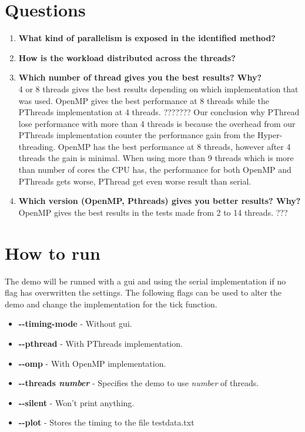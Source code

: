 \documentclass[a4paper,11pt]{article}
\begin{document}
\section{Questions}
\begin{enumerate}[label=\Alph*.]
\item \textbf{What kind of parallelism is exposed in the identified
  method?}\\
  
\item \textbf{How is the workload distributed across the threads?}\\
  
\item \textbf{Which number of thread gives you the best results?
  Why?}\\ 4 or 8 threads gives the best results depending on which
  implementation that was used. OpenMP gives the best performance at 8
  threads while the PThreads implementation at 4 threads. ??????? Our
  conclusion why PThread lose performance with more than 4 threads is
  because the overhead from our PThreads implementation counter the
  performance gain from the Hyper-threading. OpenMP has the best
  performance at 8 threads, however after 4 threads the gain is
  minimal. When using more than 9 threads which is more than number of
  cores the CPU has, the performance for both OpenMP and PThreads gets
  worse, PThread get even worse result than serial.
\item \textbf{Which version (OpenMP, Pthreads) gives you better
  results? Why?}\\ OpenMP gives the best results in the tests made
  from 2 to 14 threads. ???
\end{enumerate}
\section{How to run}
The demo will be runned with a gui and using the serial implementation
if no flag has overwritten the settings. The following flags can be
used to alter the demo and change the implementation for the tick
function.
\begin{itemize}[label=,leftmargin=0pt]
\item \textbf{-\--timing-mode} - Without gui.
\item \textbf{-\--pthread} - With PThreads implementation.
\item \textbf{-\--omp} - With OpenMP implementation.
\item \textbf{-\--threads \textit{number}} - Specifies the demo to use
  \textit{number} of threads.
\item \textbf{-\--silent} - Won't print anything.
\item \textbf{-\--plot} - Stores the timing to the file testdata.txt
\end{itemize}
\end{document}
